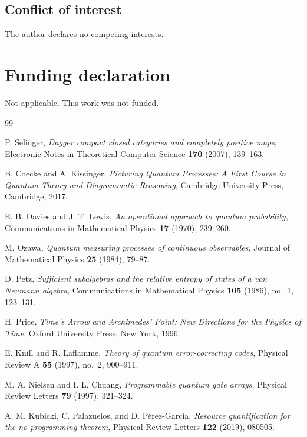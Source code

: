 \documentclass[11pt]{article}
\begin{document}
\subsection*{Conflict of interest}
The author declares no competing interests.

\section*{Funding declaration}
Not applicable. This work was not funded.

\begin{thebibliography}{99}

P. Selinger, \emph{Dagger compact closed categories and completely positive
maps}, Electronic Notes in Theoretical Computer Science \textbf{170}
(2007), 139--163.

B. Coecke and A. Kissinger, \emph{Picturing Quantum Processes: A First
Course in Quantum Theory and Diagrammatic Reasoning}, Cambridge University
Press, Cambridge, 2017.

E. B. Davies and J. T. Lewis, \emph{An operational approach to quantum
probability}, Communications in Mathematical Physics \textbf{17} (1970),
239--260.

M. Ozawa, \emph{Quantum measuring processes of continuous observables},
Journal of Mathematical Physics \textbf{25} (1984), 79--87.

D. Petz, \emph{Sufficient subalgebras and the relative entropy of states of
a von Neumann algebra}, Communications in Mathematical Physics \textbf{105}
(1986), no.~1, 123--131.

H. Price, \emph{Time's Arrow and Archimedes' Point: New Directions for the
Physics of Time}, Oxford University Press, New York, 1996.

E. Knill and R. Laflamme, \emph{Theory of quantum error-correcting codes},
Physical Review A \textbf{55} (1997), no.~2, 900--911.

M. A. Nielsen and I. L. Chuang, \emph{Programmable quantum gate arrays},
Physical Review Letters \textbf{79} (1997), 321--324.

A. M. Kubicki, C. Palazuelos, and D. P\'erez-Garc\'ia, \emph{Resource
quantification for the no-programming theorem}, Physical Review Letters
\textbf{122} (2019), 080505.


\end{thebibliography}
\end{document}
